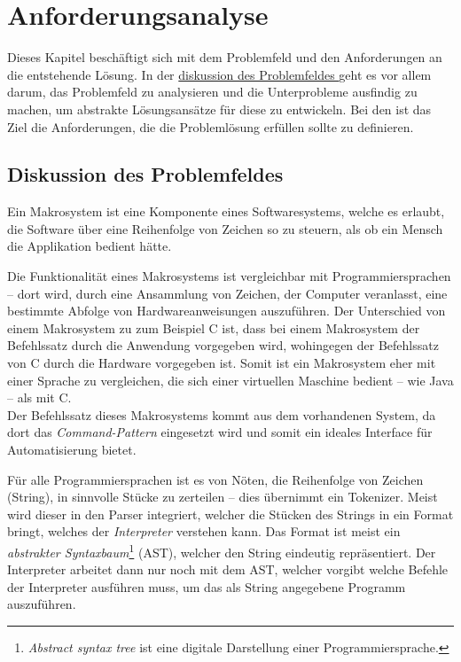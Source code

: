 \section{An\-for\-de\-rungs\-ana\-ly\-se}
\label{sec:Anforderungsanalyse}
  Dieses Kapitel beschäftigt sich mit dem Problemfeld und den Anforderungen an die entstehende Lösung. In der \hyperref[ssec:Diskussion des Problemfeldes]{
    diskussion des Problemfeldes
  } geht es vor allem darum, das Problemfeld zu analysieren und die Unterprobleme ausfindig zu machen, um abstrakte Lösungsansätze für diese zu entwickeln. Bei den  ist das Ziel die Anforderungen, die die Problemlösung erfüllen sollte zu definieren.

  \subsection{Diskussion des Problemfeldes}
  \label{ssec:Diskussion des Problemfeldes}
    Ein Makrosystem ist eine Komponente eines Softwaresystems, welche es erlaubt, die Software über eine Reihenfolge von Zeichen so zu steuern, als ob ein Mensch die Applikation bedient hätte.

    Die Funktionalität eines Makrosystems ist vergleichbar mit Programmiersprachen -- dort wird, durch eine Ansammlung von Zeichen, der Computer veranlasst, eine bestimmte Abfolge von Hardwareanweisungen auszuführen. Der Unterschied von einem Makrosystem zu zum Beispiel C ist, dass bei einem Makrosystem der Befehlssatz durch die Anwendung vorgegeben wird, wohingegen der Befehlssatz von C durch die Hardware vorgegeben ist. Somit ist ein Makrosystem eher mit einer Sprache zu vergleichen, die sich einer virtuellen Maschine bedient -- wie Java -- als mit C.\\
    Der Befehlssatz dieses Makrosystems kommt aus dem vorhandenen System, da dort das \emph{Command-Pattern}\autocite[S.263]{Gamma:1995:DPE:186897} eingesetzt wird und somit ein ideales Interface für Automatisierung bietet.

    Für alle Programmiersprachen ist es von Nöten, die Reihenfolge von Zeichen (String), in sinnvolle Stücke zu zerteilen -- dies übernimmt ein Tokenizer. Meist wird dieser in den Parser integriert, welcher die Stücken des Strings in ein Format bringt, welches der \emph{Interpreter}\autocite[S.274]{Gamma:1995:DPE:186897} verstehen kann. Das Format ist meist ein \emph{abstrakter Syntaxbaum}\footnote{%
      \textit{Abstract syntax tree} ist eine digitale Darstellung einer Programmiersprache.
    } (AST), welcher den String eindeutig repräsentiert. Der Interpreter arbeitet dann nur noch mit dem AST, welcher vorgibt welche Befehle der Interpreter ausführen muss, um das als String angegebene Programm auszuführen.

